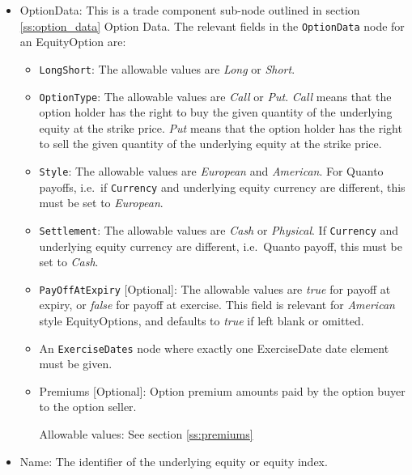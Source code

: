 \begin{itemize}
	\item OptionData: This is a trade component sub-node outlined in section \ref{ss:option_data} Option Data. The relevant fields in the \lstinline!OptionData! node for an EquityOption are:

	
	\begin{itemize}
	\item \lstinline!LongShort!: The allowable values are \emph{Long} or \emph{Short}.

	\item \lstinline!OptionType!: The allowable values are \emph{Call} or \emph{Put}.  \emph{Call} means that the option holder has the right to buy the given quantity of the underlying equity at the strike price.  \emph{Put} means that the option holder has the right to sell the given quantity of the underlying equity at the strike price. 
	
\item  \lstinline!Style!: The allowable values are \emph{European} and \emph{American}. For Quanto payoffs, i.e.\ if \lstinline!Currency! and underlying equity currency are different, this must be set to \emph{European}.

\item  \lstinline!Settlement!: The allowable values are \emph{Cash} or \emph{Physical}. If
\lstinline!Currency! and underlying equity currency are different, i.e.\ Quanto payoff, this
must be set to \emph{Cash}.

\item \lstinline!PayOffAtExpiry! [Optional]: The allowable values are \emph{true} for payoff at expiry, or \emph{false} for payoff at exercise. This field is relevant for \emph{American} style EquityOptions, and defaults to \emph{true} if left blank or omitted. 

\item An \lstinline!ExerciseDates! node where exactly one ExerciseDate date element must be given. 

\item Premiums [Optional]: Option premium amounts paid by the option buyer to the option seller.

Allowable values:  See section \ref{ss:premiums}

\end{itemize}
	

	\item Name: The identifier of the underlying equity or equity index. 
	

\end{itemize}
